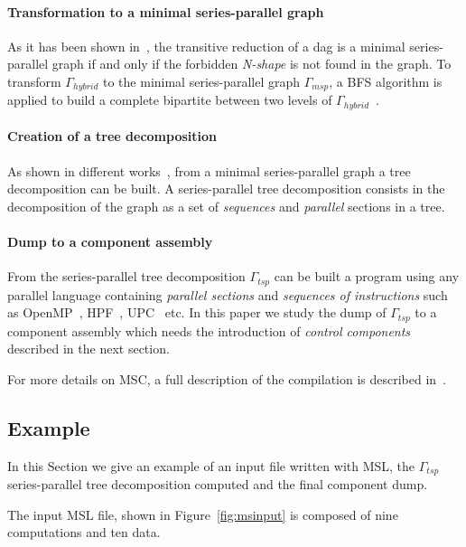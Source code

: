 \paragraph{Transformation to a minimal series-parallel graph} As it has been shown in~\cite{Valdes:1979:RSP:800135.804393}, the transitive reduction of a dag is a minimal series-parallel graph if and only if the forbidden \emph{N-shape} is not found in the graph. To transform $\Gamma_{hybrid}$ to the minimal series-parallel graph $\Gamma_{msp}$, a BFS algorithm is applied to build a complete bipartite between two levels of $\Gamma_{hybrid}$~\cite{Mitchell:2004:CMV:1082101.1082117}.

\paragraph{Creation of a tree decomposition} As shown in different works~\cite{Valdes:1979:RSP:800135.804393,Schoenmakers95anew}, from a minimal series-parallel graph a tree decomposition can be built. A series-parallel tree decomposition consists in the decomposition of the graph as a set of \emph{sequences} and \emph{parallel} sections in a tree. 

\paragraph{Dump to a component assembly} From the series-parallel tree decomposition $\Gamma_{tsp}$ can be built a program using any parallel language containing \emph{parallel sections} and \emph{sequences of instructions} such as OpenMP~\cite{660313}, HPF~\cite{219857}, UPC~\cite{El-Ghazawi:2006:UUP:1188455.1188483} etc. In this paper we study the dump of $\Gamma_{tsp}$ to a component assembly which needs the introduction of \emph{control components} described in the next section.

For more details on MSC, a full description of the compilation is described in~\cite{}.

\subsection{Example}
In this Section we give an example of an input file written with MSL, the $\Gamma_{tsp}$ series-parallel tree decomposition computed and the final component dump.

The input MSL file, shown in Figure~\ref{fig:msinput} is composed of nine computations and ten data.

